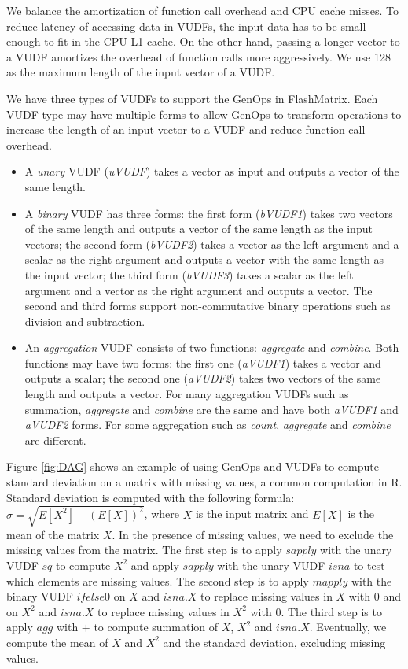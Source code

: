We balance the amortization of function call overhead and CPU cache misses.
To reduce latency of accessing data in VUDFs,
the input data has to be small enough to fit in the CPU L1 cache. On the
other hand, passing a longer vector to a VUDF amortizes the overhead of
function calls more aggressively. We use 128 as the maximum length of
the input vector of a VUDF. %

We have three types of VUDFs to support the GenOps in FlashMatrix. Each VUDF
type may have multiple forms to allow GenOps to transform operations to
increase the length of an input vector to a VUDF and reduce function call
overhead.
\begin{itemize}
	\item A \textit{unary} VUDF (\textit{uVUDF}) takes a vector
		as input and outputs a vector of the same length.
	\item A \textit{binary} VUDF has three forms: the first form (\textit{bVUDF1}) 
    takes two vectors of the same length and outputs
		a vector of the same length as the input vectors; the second form (\textit{bVUDF2}) 
    takes a vector as the left argument and a scalar
		as the right argument and outputs a vector with the same length as
		the input vector; the third form (\textit{bVUDF3}) takes a scalar
		as the left argument and a vector as the right argument and outputs
		a vector. The second and third forms support non-commutative binary
		operations such as division and subtraction.
	\item An \textit{aggregation} VUDF consists of two functions:
		\textit{aggregate} and \textit{combine}. Both functions may have two
		forms: the first one (\textit{aVUDF1}) takes a vector and
		outputs a scalar; the second one (\textit{aVUDF2}) takes
		two vectors of the same length and outputs a vector. For many
		aggregation VUDFs such as summation, \textit{aggregate} and
		\textit{combine} are the same and have both \textit{aVUDF1} and
		\textit{aVUDF2} forms. For some aggregation such as \textit{count},
		\textit{aggregate} and \textit{combine} are different.
\end{itemize}

Figure \ref{fig:DAG} shows an example of using GenOps and VUDFs to compute
standard deviation on a matrix with missing values, a common computation in R.
Standard deviation is computed with the following
formula: $\sigma = \sqrt{E[X^2] - (E[X])^2}$, where $X$ is the input matrix and
$E[X]$ is the mean of the matrix $X$. In the presence of missing values, we
need to exclude the missing values from the matrix. The first step is to apply
$sapply$ with the unary VUDF $sq$ to compute $X^2$ and apply $sapply$ with
the unary VUDF $isna$ to test which elements are missing values. The second
step is to apply $mapply$ with the binary VUDF $ifelse0$ on $X$ and $isna.X$
to replace missing
values in $X$ with 0 and on $X^2$ and $isna.X$ to replace missing values in
$X^2$ with 0. The third step is to apply $agg$ with $+$ to compute summation
of $X$, $X^2$ and $isna.X$. Eventually, we compute the mean of $X$ and
$X^2$ and the standard deviation, excluding missing values.


